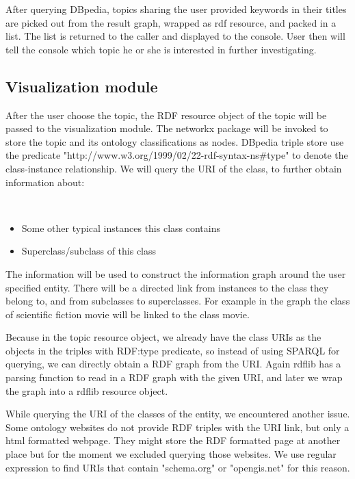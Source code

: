 \documentclass[12pt]{cls}
\begin{document}
After querying DBpedia, topics sharing the user provided keywords in their titles are picked out from the result graph, wrapped as rdf resource, and packed in a list. The list is returned to the caller and displayed to the console. User then will tell the console which topic he or she is interested in further investigating.



\subsection{Visualization module}

After the user choose the topic, the RDF resource object of the topic will be passed to the visualization module. The networkx package will be invoked to store the topic and its ontology classifications as nodes. DBpedia triple store use the predicate "http://www.w3.org/1999/02/22-rdf-syntax-ns\#type" to denote the class-instance relationship. We will query the URI of the class, to further obtain information about:

\begin{center}
~\\
\end{center}
\begin{itemize}
\item Some other typical instances this class contains
\item Superclass/subclass of this class
\end{itemize}

The information will be used to construct the information graph around the user specified entity. There will be a directed link from instances to the class they belong to, and from subclasses to superclasses. For example in the graph the class of scientific fiction movie will be linked to the class movie.

Because in the topic resource object, we already have the class URIs as the objects in the triples with RDF:type predicate, so instead of using SPARQL for querying, we can directly obtain a RDF graph from the URI. Again rdflib has a parsing function to read in a RDF graph with the given URI, and later we wrap the graph into a rdflib resource object.

While querying the URI of the classes of the entity, we encountered another issue. Some ontology websites do not provide RDF triples with the URI link, but only a html formatted webpage. They might store the RDF formatted page at another place but for the moment we excluded querying those websites. We use regular expression to find URIs that contain "schema.org" or "opengis.net" for this reason.
\end{document}

